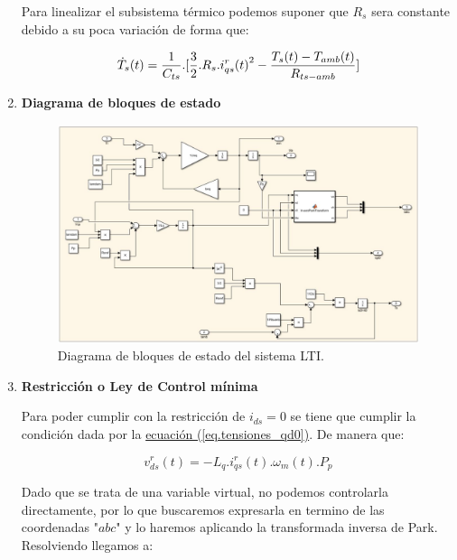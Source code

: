 \documentclass{article}
\begin{document}
\begin{enumerate}[label=\roman*.]
    Para linealizar el subsistema térmico podemos suponer que $R_s$ sera constante debido a su poca variación
    de forma que:

    \begin{equation}
        \dot{T}_{s}(t) = \frac{1}{C_{ts}}.[\frac{3}{2}.R_{s}.{i_{qs}^r(t)}^2 - \frac{T_{s}(t)-T_{amb}(t)}{R_{ts-amb}}]\\
    \end{equation}
        
    \item \textbf{Diagrama de bloques de estado}
    
    \begin{figure}[H]
        \centering
        \includegraphics[width=1\textwidth]{LTI.png}
        \caption{Diagrama de bloques de estado del sistema LTI.}
    \end{figure}
    
    \item \textbf{Restricción o Ley de Control mínima}

    Para poder cumplir con la restricción de $i_{ds} = 0$ se tiene que cumplir la condición dada por la
    \hyperref[eq.tensiones_qd0]{ecuación (\ref*{eq.tensiones_qd0})}. De manera que:

    \begin{equation}
        v_{ds}^r(t) = -L_{q}.i_{qs}^r(t).\omega_{m}(t).P_{p}
    \end{equation}

    Dado que se trata de una variable virtual, no podemos controlarla directamente, por lo que buscaremos
    expresarla en termino de las coordenadas "$abc$" y lo haremos aplicando la transformada inversa de Park.
    Resolviendo llegamos a:


\end{enumerate}
\end{document}
